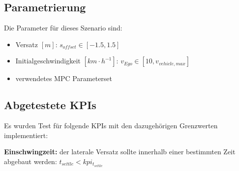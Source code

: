 \subsection{Parametrierung}
Die Parameter für dieses Szenario sind:
\begin{itemize}
    \item Versatz $[m]$: $s_{offset} \in [-1.5,1.5]$ 
    \item Initialgeschwindigkeit $[km\cdot h^{-1}]$: $v_{Ego} \in [10,v_{vehicle,max}]$
    \item verwendetes MPC Parameterset 
\end{itemize}

\subsection{Abgetestete KPIs}
Es wurden Test für folgende KPIs mit den dazugehörigen Grenzwerten implementiert:

\medskip\noindent\textbf{Einschwingzeit:} der laterale Versatz sollte innerhalb einer bestimmten Zeit abgebaut werden: $t_{settle} < kpi_{t_{settle}}$

